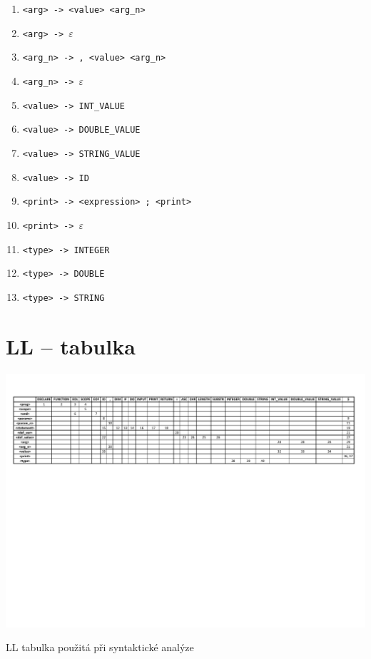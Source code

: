 \documentclass[a4paper, 11pt]{article}
\begin{document}
\begin{enumerate}[noitemsep]
		\item \verb|<arg> -> <value> <arg_n>|
		\item \verb|<arg> -> |$\varepsilon$

		\item \verb|<arg_n> -> , <value> <arg_n>|
		\item \verb|<arg_n> -> |$\varepsilon$

		\item \verb|<value> -> INT_VALUE|
		\item \verb|<value> -> DOUBLE_VALUE|
		\item \verb|<value> -> STRING_VALUE|
		\item \verb|<value> -> ID|

		\item \verb|<print> -> <expression> ; <print>|
		\item \verb|<print> -> |$\varepsilon$

		\item \verb|<type> -> INTEGER|
		\item \verb|<type> -> DOUBLE|
		\item \verb|<type> -> STRING|
	\end{enumerate}

	\newpage

	\section{LL -- tabulka}

	\begin{table}[!ht]
		\centering
		\includegraphics[width=1\linewidth]{inc/LL_table.pdf}
		\caption{LL tabulka použitá při syntaktické analýze}
		\label{table:ll_table}
	\end{table}
\end{document}
